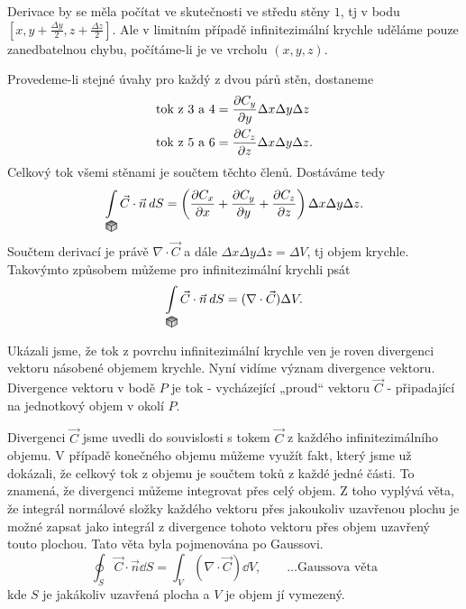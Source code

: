 {    Derivace by se měla počítat ve skutečnosti ve středu stěny $1$, tj v bodu $[x, y+\frac{\Delta 
    y}{2}, z + \frac{\Delta z}{2}]$. Ale v limitním případě infinitezimální krychle uděláme pouze 
    zanedbatelnou chybu, počítáme-li je ve vrcholu $(x,y,z)$.
    
    Provedeme-li stejné úvahy pro každý z dvou párů stěn, dostaneme    
    \begin{align*}
     \text{tok z 3 a 4} &= \frac{\partial C_y}{\partial y}\Delta x\Delta y\Delta z   \\ 
     \text{tok z 5 a 6} &= \frac{\partial C_z}{\partial z}\Delta x\Delta y\Delta z.
    \end{align*}       
    Celkový tok všemi stěnami je součtem těchto členů. Dostáváme tedy
    \begin{equation}
     \limitint_{\mathclap{\substack{\cube}}}\vec{C}\cdot\vec{n}\dd{S}
        = \left(\pder{C_x}{x}+\pder{C_y}{y} +
          \pder{C_z}{z}\right)\Delta x\Delta y \Delta z.
    \end{equation}
    Součtem derivací je právě $\nabla\cdot\vec{C}$ a dále $\Delta x\Delta y \Delta z = \Delta V$, 
    tj objem krychle. Takovýmto způsobem můžeme pro infinitezimální krychli psát
    \begin{equation}
      \limitint_{\mathclap{\substack{\cube}}}\vec{C}\cdot\vec{n}\dd{S}
       = (\nabla\cdot\vec{C})\Delta V.       \label{fyz:eq_gauss1}
    \end{equation}
    
    Ukázali jsme, že tok z povrchu infinitezimální krychle ven je roven divergenci vektoru násobené 
    objemem krychle. Nyní vidíme význam divergence vektoru. Divergence vektoru v bodě \(P\) je tok 
    - vycházející „proud“ vektoru $\vec{C}$ - připadající na jednotkový objem v okolí \(P\).
    
    Divergenci \(\vec{C}\) jsme uvedli do souvislosti s tokem \(\vec{C}\) z každého 
    infinitezimálního objemu. V případě konečného objemu můžeme využít fakt, který jsme už 
    dokázali, že celkový tok z objemu je součtem toků z každé jedné části. To znamená, že 
    divergenci můžeme integrovat přes celý objem. Z toho vyplývá věta, že integrál normálové složky 
    každého vektoru přes jakoukoliv uzavřenou plochu je možné zapsat jako integrál z divergence 
    tohoto vektoru přes objem uzavřený touto plochou. Tato věta byla pojmenována po Gaussovi.
    \begin{equation}\label{fyz:eq_gauss_veta}
     \oint_S \vec{C}\cdot\vec{n}\dd{S} 
       = \int_V (\nabla\cdot\vec{C})\dd{V}, \qquad\ldots\text{Gaussova věta}
    \end{equation}
    kde $S$ je jakákoliv uzavřená plocha a $V$ je objem jí vymezený.
    
}
